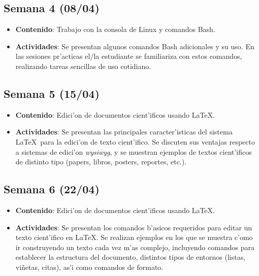 \documentclass[letterpaper,11pt]{exam}
\begin{document}
\begin{multicols}{2}
\begin{scriptsize}
\subsection*{Semana 4 (08/04)}
\begin{itemize}
\item \textbf{Contenido}: Trabajo con la consola de Linux y comandos Bash. 
\item \textbf{Actividades}: Se presentan algunos comandos Bash adicionales y su uso. En las sesiones pr'acticas el/la estudiante se familiariza con estos comandos, realizando tareas sencillas de uso cotidiano.
\end{itemize}

\subsection*{Semana 5 (15/04)}
\begin{itemize}
\item \textbf{Contenido}: Edici'on de documentos cient'ificos usando \LaTeX. 
\item \textbf{Actividades}: Se presentan las principales caracter'isticas del sistema \LaTeX\ para la edici'on de texto cient'ifico. Se discuten sus ventajas respecto a sistemas de edici'on \textit{wysiwyg}, y se muestran ejemplos de textos cient'ificos de distinto tipo (papers, libros, posters, reportes, etc.).
\end{itemize}

\subsection*{Semana 6 (22/04)}
\begin{itemize}
\item \textbf{Contenido}: Edici'on de documentos cient'ificos usando \LaTeX.
\item \textbf{Actividades}: Se presentan los comandos b'asicos requeridos para editar un texto cient'ifico en \LaTeX. Se realizan ejemplos en los que se muestra c'omo ir construyendo un texto cada vez m'as complejo, incluyendo comandos para establecer la estructura del documento, distintos tipos de entornos (listas, vi\~netas, citas), as'i como comandos de formato.
\end{itemize}


\end{scriptsize}
\end{multicols}
\end{document}
